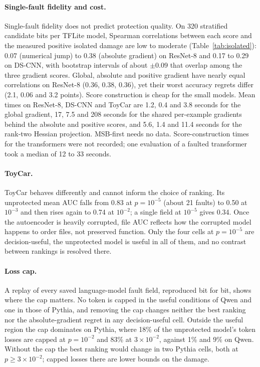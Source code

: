 \paragraph{Single-fault fidelity and cost.} Single-fault fidelity does not predict protection quality. On 320 stratified candidate bits per TFLite model, Spearman correlations between each score and the measured positive isolated damage are low to moderate (Table~\ref{tab:isolated}): 0.07 (numerical jump) to 0.38 (absolute gradient) on ResNet-8 and 0.17 to 0.29 on DS-CNN, with bootstrap intervals of about $\pm0.09$ that overlap among the three gradient scores. Global, absolute and positive gradient have nearly equal correlations on ResNet-8 (0.36, 0.38, 0.36), yet their worst accuracy regrets differ (2.1, 0.06 and 3.2 points). Score construction is cheap for the small models. Mean times on ResNet-8, DS-CNN and ToyCar are 1.2, 0.4 and 3.8 seconds for the global gradient, 17, 7.5 and 208 seconds for the shared per-example gradients behind the absolute and positive scores, and 5.6, 1.4 and 11.4 seconds for the rank-two Hessian projection. MSB-first needs no data. Score-construction times for the transformers were not recorded; one evaluation of a faulted transformer took a median of 12 to 33 seconds.

\paragraph{ToyCar.} ToyCar behaves differently and cannot inform the choice of ranking. Its unprotected mean AUC falls from 0.83 at $p=10^{-5}$ (about 21 faults) to 0.50 at $10^{-3}$ and then rises again to 0.74 at $10^{-2}$; a single field at $10^{-5}$ gives 0.34. Once the autoencoder is heavily corrupted, file AUC reflects how the corrupted model happens to order files, not preserved function. Only the four cells at $p=10^{-5}$ are decision-useful, the unprotected model is useful in all of them, and no contrast between rankings is resolved there.

\paragraph{Loss cap.} A replay of every saved language-model fault field, reproduced bit for bit, shows where the cap matters. No token is capped in the useful conditions of Qwen and one in those of Pythia, and removing the cap changes neither the best ranking nor the absolute-gradient regret in any decision-useful cell. Outside the useful region the cap dominates on Pythia, where 18\% of the unprotected model's token losses are capped at $p=10^{-2}$ and 83\% at $3\times10^{-2}$, against 1\% and 9\% on Qwen. Without the cap the best ranking would change in two Pythia cells, both at $p\ge3\times10^{-2}$; capped losses there are lower bounds on the damage.


